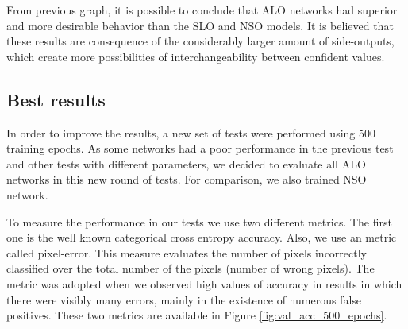 From previous graph, it is possible to conclude that ALO networks had superior and more desirable behavior than the SLO and NSO models. It is believed that these results are consequence of the considerably larger amount of side-outputs, which create more possibilities of interchangeability between confident values.

\subsection{Best results}

In order to improve the results, a new set of tests were performed using 500 training epochs. As some networks had a poor performance in the previous test and other tests with different parameters, we decided to evaluate all ALO networks in this new round of tests. For comparison, we also trained NSO network.

To measure the performance in our tests we use two different metrics. The first one is the well known categorical cross entropy accuracy. Also, we use an metric called pixel-error. This measure evaluates the number of pixels incorrectly classified over the total number of the pixels (number of wrong pixels). The metric was adopted when we observed high values of accuracy in results in which there were visibly many errors, mainly in the existence of numerous false positives. These two metrics are available in Figure \ref{fig:val_acc_500_epochs}.

